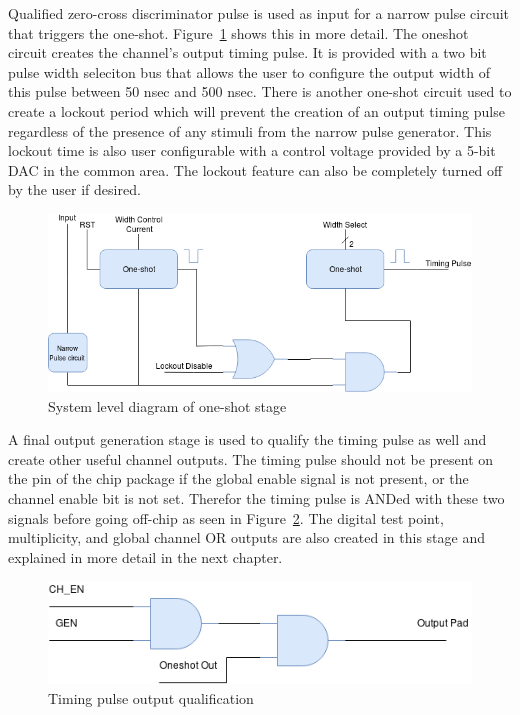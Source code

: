 \documentclass[12pt,oneside,final]{siuethesis}
\theoremstyle{definition}
\begin{document}
\par Qualified zero-cross discriminator pulse is used as input for a narrow pulse circuit that triggers the one-shot. Figure~\ref{fig:oneshot} shows this in more detail. The oneshot circuit creates the channel's output timing pulse. It is provided with a two bit pulse width seleciton bus that allows the user to configure the output width of this pulse between 50 nsec and 500 nsec. There is another one-shot circuit used to create a lockout period which will prevent the creation of an output timing pulse regardless of the presence of any stimuli from the narrow pulse generator. This lockout time is also user configurable with a control voltage provided by a 5-bit DAC in the common area. The lockout feature can also be completely turned off by the user if desired.

\begin{figure}[h!]
\centering
\includegraphics[scale=.65,keepaspectratio=true]{./ch2_figures/oneshot.png} 
\caption{System level diagram of one-shot stage}
\label{fig:oneshot}
\end{figure}

\par A final output generation stage is used to qualify the timing pulse as well and create other useful channel outputs. The timing pulse should not be present on the pin of the chip package if the global enable signal is not present, or the channel enable bit is not set. Therefor the timing pulse is ANDed with these two signals before going off-chip as seen in Figure~\ref{fig:output-qual}. The digital test point, multiplicity, and global channel OR outputs are also created in this stage and explained in more detail in the next chapter.

\begin{figure}[h!]
\centering
\includegraphics[scale=.7,keepaspectratio=true]{./ch2_figures/output.png} 
\caption{Timing pulse output qualification}
\label{fig:output-qual}
\end{figure}
\end{document}
